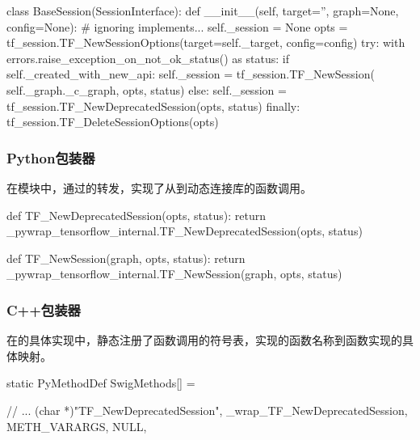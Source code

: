 \begin{content}
\begin{leftbar}
\begin{python}[caption={tensorflow/python/client/session.py}]
class BaseSession(SessionInterface):
  def __init__(self, target='', graph=None, config=None):
    # ignoring implements...
    self._session = None
    opts = tf_session.TF_NewSessionOptions(target=self._target,
                                           config=config)
    try:
      with errors.raise_exception_on_not_ok_status() as status:
        if self._created_with_new_api:
          self._session = tf_session.TF_NewSession(
              self._graph._c_graph, opts, status)
        else:
          self._session = tf_session.TF_NewDeprecatedSession(opts, status)
    finally:
      tf_session.TF_DeleteSessionOptions(opts)
\end{python}
\end{leftbar}

\subsubsection{Python包装器}

在模块中，通过的转发，实现了从到动态连接库的函数调用。

\begin{leftbar}
\begin{python}[caption={tensorflow/bazel-bin/tensorflow/python/pywrap\_tensorflow\_internal.py}]
def TF_NewDeprecatedSession(opts, status):
    return _pywrap_tensorflow_internal.TF_NewDeprecatedSession(opts, status)

def TF_NewSession(graph, opts, status):
  return _pywrap_tensorflow_internal.TF_NewSession(graph, opts, status)
\end{python}
\end{leftbar}

\subsubsection{C++包装器}

在的具体实现中，静态注册了函数调用的符号表，实现的函数名称到\cpp{}函数实现的具体映射。

\begin{leftbar}
\begin{c++}[caption={tensorflow/bazel-bin/tensorflow/python/pywrap\_tensorflow\_internal.cc}]
static PyMethodDef SwigMethods[] = {
   // ...
   { (char *)"TF_NewDeprecatedSession", 
     _wrap_TF_NewDeprecatedSession, METH_VARARGS, NULL},

}
\end{c++}
\end{leftbar}
\end{content}
